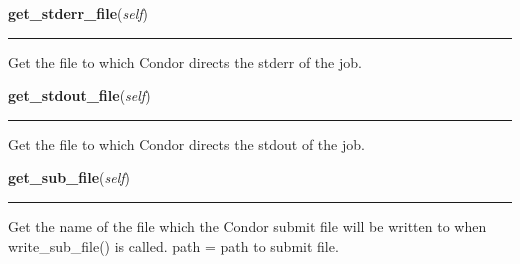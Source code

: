     \noindent\begin{boxedminipage}{\textwidth}

    \raggedright \textbf{get\_stderr\_file}(\textit{self})

    \vspace{-1.5ex}

    \rule{\textwidth}{0.5\fboxrule}
    Get the file to which Condor directs the stderr of the job.

    \vspace{1ex}

    \end{boxedminipage}

    \label{pipeline:CondorJob:get_stdout_file}
    \vspace{0.5ex}

    \noindent\begin{boxedminipage}{\textwidth}

    \raggedright \textbf{get\_stdout\_file}(\textit{self})

    \vspace{-1.5ex}

    \rule{\textwidth}{0.5\fboxrule}
    Get the file to which Condor directs the stdout of the job.

    \vspace{1ex}

    \end{boxedminipage}

    \label{pipeline:CondorJob:get_sub_file}
    \vspace{0.5ex}

    \noindent\begin{boxedminipage}{\textwidth}

    \raggedright \textbf{get\_sub\_file}(\textit{self})

    \vspace{-1.5ex}

    \rule{\textwidth}{0.5\fboxrule}
    Get the name of the file which the Condor submit file will be written 
    to when write\_sub\_file() is called. path = path to submit file.

    \vspace{1ex}

    \end{boxedminipage}

    \label{pipeline:CondorJob:set_log_file}
    \vspace{0.5ex}

